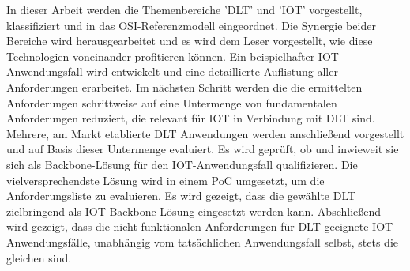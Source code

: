 \documentclass[
    ngerman,american
    ]{scrartcl}
\newcommand{\lang}{de}
\begin{document}
\begin{description}[style=unboxed]
            \item [\questionThree{\lang}]
		In dieser Arbeit werden die Themenbereiche 'DLT' und 'IOT' vorgestellt, klassifiziert und in das OSI-Referenzmodell eingeordnet. Die Synergie beider Bereiche wird herausgearbeitet und es wird dem Leser vorgestellt, wie diese Technologien voneinander profitieren können. Ein beispielhafter IOT-Anwendungsfall wird entwickelt und eine detaillierte Auflistung aller Anforderungen erarbeitet. Im nächsten Schritt werden die die ermittelten Anforderungen schrittweise auf eine Untermenge von fundamentalen Anforderungen reduziert, die relevant für IOT in Verbindung mit DLT sind. Mehrere, am Markt etablierte DLT Anwendungen werden anschließend vorgestellt und auf Basis dieser Untermenge evaluiert. Es wird geprüft, ob und inwieweit sie sich als Backbone-Lösung für den IOT-Anwendungsfall qualifizieren. Die vielversprechendste Lösung wird in einem PoC umgesetzt, um die Anforderungsliste zu evaluieren. Es wird gezeigt, dass die gewählte DLT zielbringend als IOT Backbone-Lösung eingesetzt werden kann. Abschließend wird gezeigt, dass die nicht-funktionalen Anforderungen für DLT-geeignete IOT-Anwendungsfälle, unabhängig vom tatsächlichen Anwendungsfall selbst, stets die gleichen sind.


\end{description}
\end{document}
